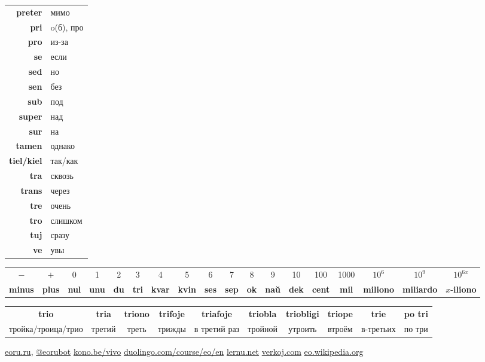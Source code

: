 \documentclass{article}
\def\b#1{\textbf{#1}}
\begin{document}
\begin{tabular}{>{\bfseries}rl}
preter & мимо \\
pri & o(б), про \\
pro & из-за \\
se & если \\
sed & но \\
sen & без \\
sub & под \\
super & над \\
sur & на \\
tamen & однако \\
tiel/kiel & так/как \\
tra & сквозь \\
trans & через \\
tre & очень \\
tro & слишком \\
tuj & сразу \\
ve & увы \\
\end{tabular}

\vspace{0.5em}
\begin{tabular}{|c|c|c|c|c|c|c|c|c|c|c|c|c|c|c|c|c|c|}
\hline
$-$ & $+$ & 0 & 1 & 2 & 3 & 4 & 5 & 6 & 7 & 8 & 9 & 10 & 100 & 1000 & $10^6$ & $10^9$ & $10^{6x}$ \\
\b{minus} & \b{plus} & \b{nul} & \b{unu} & \b{du} & \b{tri} & \b{kvar} & \b{kvin} & \b{ses} & \b{sep} & \b{ok} & \b{naŭ} & \b{dek} & \b{cent} & \b{mil} & \b{miliono} & \b{miliardo} & $x$-\b{iliono} \\
\hline
\end{tabular} 

\begin{tabular}{|c|c|c|c|c|c|c|c|c|c|}
\hline
\b{trio} & \b{tria} & \b{triono} & \b{trifoje} & \b{triafoje} & \b{triobla} & \b{triobligi} & \b{triope} & \b{trie} & \b{po tri} \\
тройка/троица/трио & третий & треть & трижды & в третий раз & тройной & утроить & втроём  & в-третьих & по три \\ 
\hline
\end{tabular}

\vspace{0.5em}
\href{http://eoru.ru/}{eoru.ru}, \href{https://t.me/eoru_bot}{@eoru\textunderscore{}bot}
\quad \href{https://kono.be/vivo}{kono.be/vivo}
\quad \href{https://duolingo.com/course/eo/en}{duolingo.com/course/eo/en}
\quad \href{https://lernu.net/}{lernu.net}
\quad \href{https://verkoj.com/}{verkoj.com}
\quad \href{https://eo.wikipedia.org/}{eo.wikipedia.org}
\end{document}
